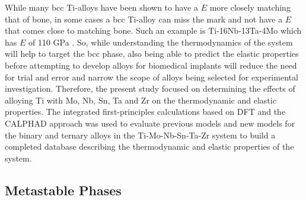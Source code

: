 While many bcc Ti-alloys have been shown to have a $E$ more closely matching that of bone, in some cases a bcc Ti-alloy can miss the mark and not have a $E$ that comes close to matching bone. Such an example is Ti-16Nb-13Ta-4Mo which has $E$ of 110 GPa \cite{Geetha2009}. So, while understanding the thermodynamics of the system will help to target the bcc phase, also being able to predict the elastic properties before attempting to develop alloys for biomedical implants will reduce the need for trial and error and narrow the scope of alloys being selected for experimental investigation. Therefore, the present study focused on determining the effects of alloying Ti with Mo, Nb, Sn, Ta and Zr on the thermodynamic and elastic properties. The integrated first-principles calculations based on DFT and the CALPHAD approach was used to evaluate previous models and new models for the binary and ternary alloys in the Ti-Mo-Nb-Sn-Ta-Zr system to build a completed database describing the thermodynamic and elastic properties of the system.

\subsection{Metastable Phases}

